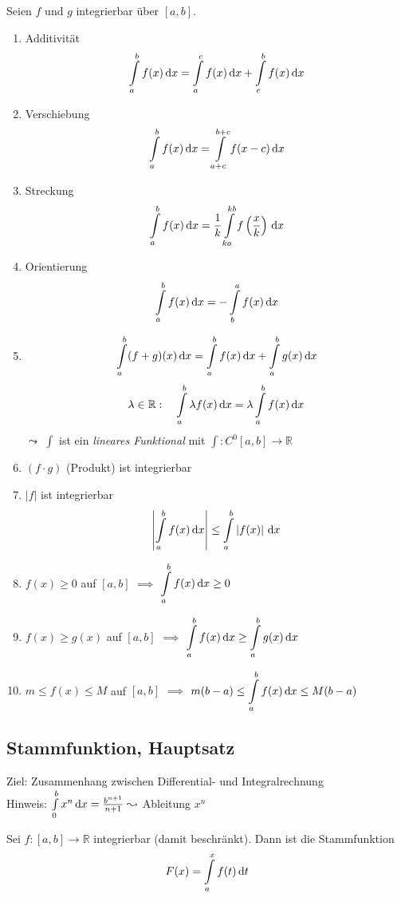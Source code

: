
\begin{theorem}
  Seien $f$ und $g$ integrierbar über $[a,b]$.
  \begin{enumerate}
    \item Additivität \[ \int\limits_a^b f(x)\,\mathrm d x = \int\limits_a^c f(x)\,\mathrm d x + \int\limits_c^b f(x)\, \mathrm d x \]
    \item Verschiebung \[ \int\limits_a^b f(x)\,\mathrm d x = \int\limits_{a+c}^{b+c} f(x-c)\,\mathrm d x \]
    \item Streckung  \[ \int\limits_a^b f(x)\,\mathrm d x = \frac 1 k \int\limits_{ka}^{kb} f\left(\frac x k\right)\,\mathrm d x \]
    \item Orientierung \[ \int\limits_a^b f(x)\,\mathrm d x = - \int\limits_b^a f(x)\,\mathrm d x \]
    \item 
      \[ \int\limits_a^b (f+g)(x)\,\mathrm d x = \int\limits_a^b f(x)\,\mathrm d x + \int\limits_a^b g(x)\,\mathrm d x \]
      \[ \lambda \in \mathbb{R}: \quad \int\limits_a^b \lambda f(x)\,\mathrm d x  = \lambda \int\limits_a^b f(x)\,\mathrm d x \]
      $\leadsto$ $\int$ ist ein \emph{lineares Funktional} mit $\int: C^0[a,b] \to \mathbb{R}$
    \item $(f \cdot g)$ (Produkt) ist integrierbar
    \item $\left| f \right|$ ist integrierbar
      \[ \left| \int\limits_a^b f(x)\,\mathrm d x\right| \leq \int\limits_a^b \left| f(x) \right| \,\mathrm d x \]
    \item $f(x) \geq 0$ auf $[a,b]$ $\implies$ $\displaystyle \int\limits_a^b f(x)\,\mathrm d x \geq 0$
    \item $f(x) \geq g(x)$ auf $[a,b]$ $\implies$ $\displaystyle \int\limits_a^b f(x)\,\mathrm d x \geq \int\limits_a^b g(x)\,\mathrm d x$
    \item $m \leq f(x) \leq M$ auf $[a,b]$ $\implies$ $\displaystyle m(b-a) \leq \int\limits_a^b f(x)\,\mathrm d x \leq M(b-a)$
  \end{enumerate}
\end{theorem}

\subsection{Stammfunktion, Hauptsatz}

Ziel: Zusammenhang zwischen Differential- und Integralrechnung\\
Hinweis: $\int\limits_0^b x^n\,\mathrm d x = \frac{b^{n+1}}{n+1} \leadsto$ Ableitung $x^n$

\begin{definition}[Stammfunktion $F$]
  Sei $f: [a,b] \to \mathbb{R}$ integrierbar (damit beschränkt). Dann ist die Stammfunktion
  \[ F(x) = \int\limits_a^x f(t)\,\mathrm d t \]
\end{definition}

